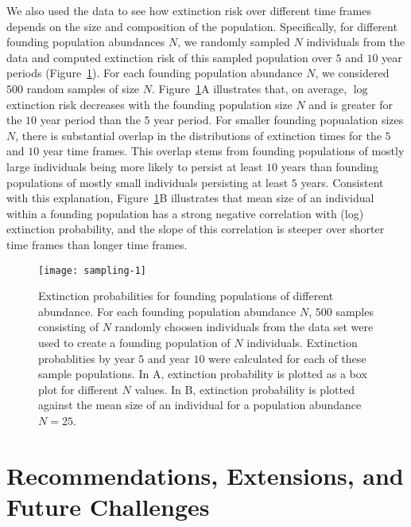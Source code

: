 \documentclass[12pt]{amsart}\usepackage[]{graphicx}\usepackage[]{color}
\makeatletter
\def\maxwidth{ %
  \ifdim\Gin@nat@width>\linewidth
    \linewidth
  \else
    \Gin@nat@width
  \fi
}
\newenvironment{knitrout}{}{} %
\makeatother
\begin{document}
We also used the data to see how extinction risk over different time frames depends on the size and composition of the population. Specifically, for different founding population abundances $N$, we randomly sampled $N$ individuals from the data and computed extinction risk of this sampled population over $5$ and $10$ year periods (Figure~\ref{fig:sampling}). For each founding population abundance $N$, we considered $500$ random samples of size $N$. Figure~\ref{fig:sampling}A illustrates that, on average, $\log$ extinction risk decreases with the founding population size $N$ and is greater for the $10$ year period than the $5$ year period. For smaller founding popualation sizes $N$, there is substantial overlap in the distributions of extinction times for the $5$ and $10$ year time frames. This overlap stems from founding populations of mostly large individuals being more likely to persist at least $10$ years than founding populations of mostly small individuals persisting at least $5$ years. Consistent with this explanation, Figure~\ref{fig:sampling}B illustrates that mean size of an individual within a founding  population has a strong negative correlation with (log) extinction probability, and the slope of this correlation is steeper over shorter time frames than longer time frames.

\begin{knitrout}
\color{fgcolor}\begin{figure}
\texttt{[image: sampling-1]} \caption[Extinction probabilities for founding populations of different abundance]{Extinction probabilities for founding populations of different abundance. For each founding population abundance $N$, $500$ samples consisting of $N$ randomly choosen individuals from the data set were used to create a founding population of $N$ individuals. Extinction probablities by year $5$ and year $10$ were calculated for each of these sample populations. In A, extinction probability is plotted as a box plot for different $N$ values. In B, extinction probability is plotted against the mean size of an individual for a population abundance $N=25$.}\label{fig:sampling}
\end{figure}


\end{knitrout}

\section*{Recommendations, Extensions, and Future Challenges}
\end{document}
